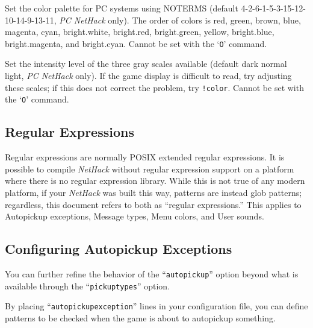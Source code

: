 \documentclass[titlepage]{article}
\begin{document}
\begin{description}[font=\mdseries\itshape]
\item[videocolors]
\begin{sloppypar}
Set the color palette for PC systems using NO\textunderscore TERMS
(default 4-2-6-1-5-3-15-12-10-14-9-13-11, \textit{PC NetHack} only).
The order of colors is red, green, brown, blue, magenta, cyan,
bright.white, bright.red, bright.green, yellow, bright.blue,
bright.magenta, and bright.cyan.
Cannot be set with the `\texttt{O}' command.
\end{sloppypar}
\item[videoshades]
Set the intensity level of the three gray scales available
(default dark normal light, \textit{PC NetHack} only).
If the game display is difficult to read, try adjusting these scales;
if this does not correct the problem, try \texttt{!color}.
Cannot be set with the `\texttt{O}' command.
\end{description}

\subsection*{Regular Expressions}

Regular expressions are normally POSIX extended regular expressions. It is
possible to compile \textit{NetHack} without regular expression support on
a platform where
there is no regular expression library. While this is not true of any modern
platform, if your \textit{NetHack} was built this way, patterns are instead glob
patterns; regardless, this document refers to both as ``regular expressions.''
This applies to Autopickup exceptions, Message types, Menu colors,
and User sounds.

\subsection*{Configuring Autopickup Exceptions}

You can further refine the behavior of the ``\texttt{autopickup}'' option
beyond what is available through the ``\texttt{pickup\textunderscore types}'' option.

By placing ``\texttt{autopickup\textunderscore exception}'' lines in your configuration
file, you can define patterns to be checked when the game is about to
autopickup something.
\end{document}
